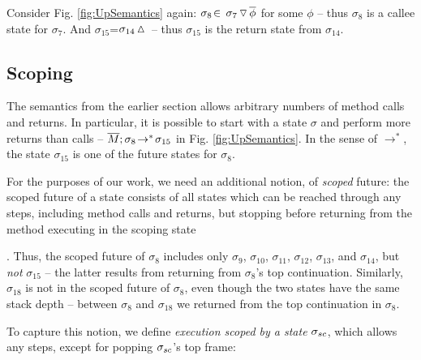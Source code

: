 Consider Fig. \ref{fig:UpSemantics} again: $\sigma_8\!\in\!    \ {\sigma_7} \, {\triangledown}\, \overline{\phi} $ for some $\phi$ -- {thus $\sigma_8$ is a callee state for 
 $\sigma_7$}. {And $\sigma_{15}$=$\sigma_{14} \, {\vartriangle}\,$ --  thus $\sigma_{15}$ is the return state from 
 $\sigma_{14}$.}

  
 \subsection{Scoping}
 \label{sect:bounded}

{The semantics from the earlier section allows arbitrary numbers of method calls and returns. 
In particular, it is possible to start with a state $\sigma$ and perform more returns than calls --
\eg $\overline{M};\sigma_{8}\! \rightarrow^*\! {\sigma_{15}}$  in  Fig. \ref{fig:UpSemantics}.
{In the sense of $\rightarrow^*$,  the state $\sigma_{15}$  is one of the future  states for $\sigma_8$.}

 
{For} the purposes of our work, we   need an {additional} notion, of  \emph{scoped} future:  
the scoped future of a state consists of all states which  can be reached through any   
 steps, including method calls and returns, but   {stopping before returning}   
from the method executing in the scoping state}. 
Thus, the {scoped} future  of $\sigma_8$   includes only
  $\sigma_9$, $\sigma_{10}$, $\sigma_{11}$, $\sigma_{12}$, $\sigma_{13}$, and $\sigma_{14}$, but \emph{not} $\sigma_{15}$  -- the latter results from returning from $\sigma_{8}$'s top continuation.  
 {Similarly, $\sigma_{18}$ is not in the scoped future of $\sigma_8$, even though the two states have the same stack depth -- between $\sigma_{8}$  and  $\sigma_{18}$ we returned from the top continuation in $\sigma_{8}$.}
 
 

To capture this  notion, we define    {\emph{execution scoped by a state} $\sigma_{sc}$, which  allows any steps, except for popping   $\sigma_{sc}$'s top frame:}
 
